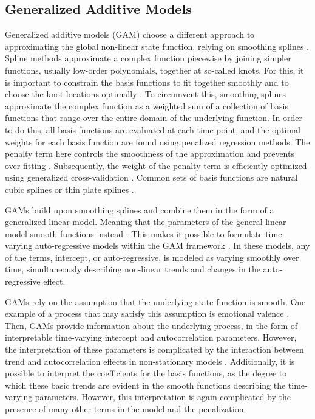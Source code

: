 \subsection{Generalized Additive Models}

Generalized additive models (GAM) choose a different approach to approximating the global 
non-linear state function, relying on smoothing splines \parencite{wood_generalized_2006, wood_inference_2020, 
hastie_generalized_1999}. 
Spline methods approximate a complex function piecewise by joining
simpler functions, usually low-order polynomials, together at so-called knots. For this,
it is important to constrain the basis functions to fit together smoothly and to choose 
the knot locations optimally \parencite{tsay_nonlinear_2019}. To circumvent this, smoothing 
splines approximate the complex function as a weighted sum of a collection of basis functions 
that range over the entire domain of the underlying function. In order to do this, all basis functions are evaluated at each 
time point, and the optimal weights for each basis function are found using penalized regression 
methods. The penalty term here controls the smoothness of the approximation and prevents 
over-fitting \parencite{gu_smoothing_2013, wahba_spline_1980}. Subsequently, the weight of the penalty term 
is efficiently optimized using generalized cross-validation \parencite{wood_generalized_2006, 
golub_generalized_1997}. Common sets of basis functions are natural cubic splines 
\parencite{tsay_nonlinear_2019} or thin plate splines \parencite{wood_thin_2003}.

GAMs build upon smoothing splines and combine them in the form of a generalized linear model. 
Meaning that the parameters of the general linear model smooth functions instead
\parencite{wood_generalized_2006, hastie_generalized_1999}. This makes it possible to formulate time-
varying auto-regressive models within the GAM framework \parencite{bringmann_changing_2017, 
bringmann_modeling_2015}. In these models, any of the terms, intercept, or auto-regressive, 
is modeled as varying smoothly over time, simultaneously describing non-linear trends and changes in the auto-regressive effect.

GAMs rely on the assumption that the underlying state function is smooth.
One example of a process that may satisfy this assumption is emotional valence 
\parencite{bringmann_modeling_2015}. Then, GAMs provide information about 
the underlying process, in the form of interpretable time-varying intercept and autocorrelation
parameters. However, the interpretation of these parameters is complicated by the interaction 
between trend and autocorrelation effects in non-stationary models 
\parencite{bauldry_nonlinear_2018, bollen_autoregressive_2004}.
Additionally, it is possible to interpret the coefficients for the basis functions, 
as the degree to which these basic trends are evident in the smooth functions describing the 
time-varying parameters. However, this interpretation is again complicated by the presence 
of many other terms in the model and the penalization.
